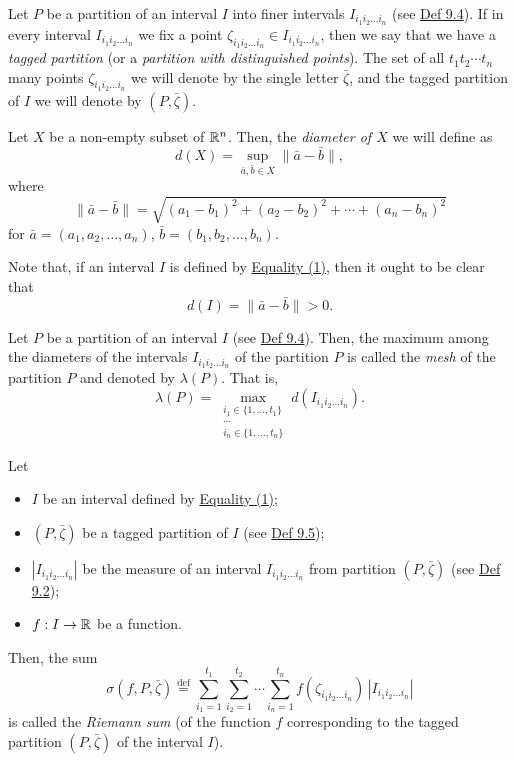 \begin{definition}\label{def:9.5}
Let $P$ be a partition of an interval $I$ into finer intervals $I_{i_1i_2\ldots i_n}$ (see \hyperref[def:9.4]{Def 9.4}). If in every interval $I_{i_1i_2\ldots i_n}$ we fix a point $\zeta_{i_1i_2\ldots i_n}\in I_{i_1i_2\ldots i_n}$, then we say that we have a \emph{tagged partition} (or a \emph{partition with distinguished points}). The set of all $t_1t_2\cdots t_n$ many points $\zeta_{i_1i_2\ldots i_n}$ we will denote by the single letter $\bar\zeta$, and the tagged partition of $I$ we will denote by $(P,\bar\zeta)$.
\end{definition}

\begin{definition}\label{def:9.6}
Let $X$ be a non-empty subset of $\mathbb{R}^n$. Then, the \emph{diameter of $X$} we will define as
\[
d(X)=\sup_{\bar a,\bar b\in X}\|\bar a-\bar b\|,
\]
where
\[
\|\bar a-\bar b\|
=\sqrt{(a_1-b_1)^2+(a_2-b_2)^2+\cdots+(a_n-b_n)^2}
\]
for $\bar a=(a_1,a_2,\ldots,a_n)$, $\bar b=(b_1,b_2,\ldots,b_n)$.

Note that, if an interval $I$ is defined by \hyperref[eq:9:1:1]{Equality (1)}, then it ought to be clear that
\[
d(I)=\|\bar a-\bar b\|>0.
\]
\end{definition}

\begin{definition}\label{def:9.7}
Let $P$ be a partition of an interval $I$ (see \hyperref[def:9.4]{Def 9.4}). Then, the maximum among the diameters of the intervals $I_{i_1i_2\ldots i_n}$ of the partition $P$ is called the \emph{mesh} of the partition $P$ and denoted by $\lambda(P)$. That is,
\[
\lambda(P)=\max_{\substack{i_1\in\{1,\ldots,t_1\}\\ \cdots\\i_n\in\{1,\ldots,t_n\}}}
d(I_{i_1i_2\ldots i_n}).
\]
\end{definition}

\begin{definition}\label{def:9.8}
Let
\begin{itemize}
    \item $I$ be an interval defined by \hyperref[eq:9:1:1]{Equality (1)};
    \item $(P,\bar\zeta)$ be a tagged partition of $I$ (see \hyperref[def:9.5]{Def 9.5});
    \item $|I_{i_1i_2\ldots i_n}|$ be the measure of an interval $I_{i_1i_2\ldots i_n}$ from partition $(P,\bar\zeta)$ (see \hyperref[def:9.2]{Def 9.2});
    \item $f:I\to\mathbb{R}$ be a function.
\end{itemize}
Then, the sum
\[
\sigma(f,P,\bar\zeta)\overset{\mathrm{def}}{=}
\sum_{i_1=1}^{t_1}\sum_{i_2=1}^{t_2}\cdots\sum_{i_n=1}^{t_n}
f(\zeta_{i_1i_2\ldots i_n})\,|I_{i_1i_2\ldots i_n}|
\]
is called the \emph{Riemann sum} (of the function $f$ corresponding to the tagged partition $(P,\bar\zeta)$ of the interval $I$).
\end{definition}


